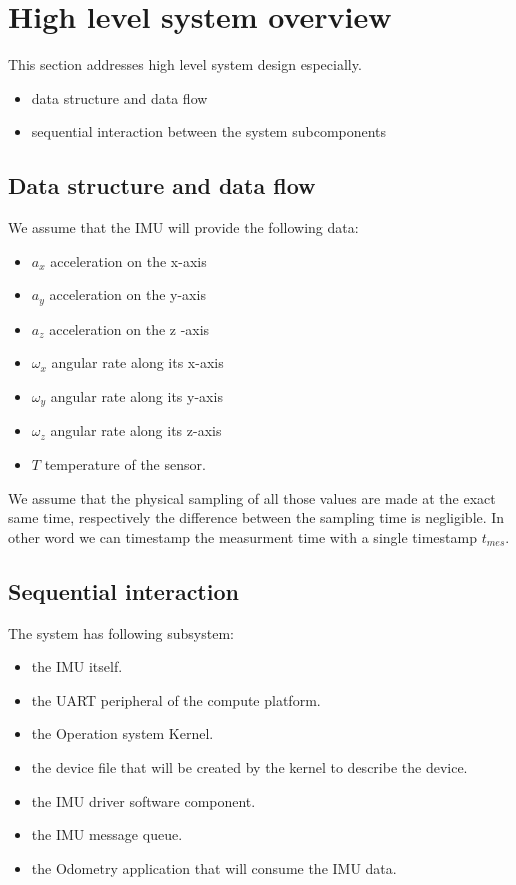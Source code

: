 \section{High level system overview}
This section addresses high level system design especially.
\begin{itemize}
    \item data structure and data flow
    \item sequential interaction between the system subcomponents
\end{itemize}

\subsection{Data structure and data flow}
We assume that the IMU will provide the following data:
\begin{itemize}
    \item $a_x$ acceleration on the x-axis
    \item $a_y$ acceleration on the y-axis
    \item $a_z$ acceleration on the z -axis
    \item $\omega_x$ angular rate along its x-axis
    \item $\omega_y$ angular rate along its y-axis
    \item $\omega_z$ angular rate along its z-axis
    \item $T$ temperature of the sensor.
\end{itemize}
We assume that the physical sampling of all those values are made at the exact same time, respectively the difference between the sampling time is negligible.
In other word we can timestamp the measurment time with a single timestamp $t_{mes}$.

\subsection{Sequential interaction}
The system has following subsystem:
\begin{itemize}
    \item the IMU itself.
    \item the UART peripheral of the compute platform.
    \item the Operation system Kernel.
    \item the device file that will be created by the kernel to describe the device.
    \item the IMU driver software component.
    \item the IMU message queue.
    \item the Odometry application that will consume the IMU data.
\end{itemize}

